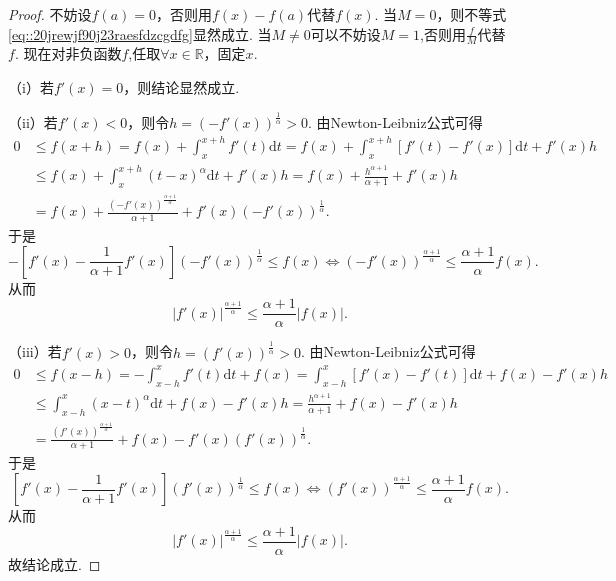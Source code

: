 \documentclass[../../main.tex]{subfiles}%
\begin{document}
\begin{proof}
不妨设$f(a)=0$，否则用$f(x) - f(a)$代替$f(x)$. 当$M = 0$，则不等式\eqref{eq::20jrewjf90j23raesfdzcgdfg}显然成立. 当$M\neq0$可以不妨设$M = 1$,否则用$\frac{f}{M}$代替$f$.
现在对非负函数$f$,任取$\forall x \in \mathbb{R}$，固定$x$.

（i）若$f'(x) = 0$，则结论显然成立.

（ii）若$f'(x) < 0$，则令$h = \left( -f'(x) \right)^{\frac{1}{\alpha}} > 0$. 由Newton-Leibniz公式可得
\begin{align*}
0 &\leqslant f(x + h) = f(x) + \int_x^{x + h} f'(t) \mathrm{d}t = f(x) + \int_x^{x + h} \left[ f'(t) - f'(x) \right] \mathrm{d}t + f'(x) h \\
&\leqslant f(x) + \int_x^{x + h} \left( t - x \right)^{\alpha} \mathrm{d}t + f'(x) h = f(x) + \frac{h^{\alpha + 1}}{\alpha + 1} + f'(x) h \\
&= f(x) + \frac{\left( -f'(x) \right)^{\frac{\alpha + 1}{\alpha}}}{\alpha + 1} + f'(x) \left( -f'(x) \right)^{\frac{1}{\alpha}}.
\end{align*}
于是
$$
-\left[ f'(x) - \frac{1}{\alpha + 1} f'(x) \right] \left( -f'(x) \right)^{\frac{1}{\alpha}} \leqslant f(x)\Longleftrightarrow \left( -f'(x) \right)^{\frac{\alpha+1}{\alpha}} \leqslant \frac{\alpha + 1}{\alpha} f(x).
$$
从而
$$
\left| f'(x) \right|^{\frac{\alpha + 1}{\alpha}} \leqslant \frac{\alpha + 1}{\alpha} |f(x)|.
$$

（iii）若$f'(x) > 0$，则令$h = \left( f'(x) \right)^{\frac{1}{\alpha}} > 0$. 由Newton-Leibniz公式可得
\begin{align*}
0 &\leqslant f(x - h) = -\int_{x - h}^x f'(t) \mathrm{d}t + f(x) = \int_{x - h}^x \left[ f'(x) - f'(t) \right] \mathrm{d}t + f(x) - f'(x) h \\
&\leqslant \int_{x - h}^x \left( x - t \right)^{\alpha} \mathrm{d}t + f(x) - f'(x) h = \frac{h^{\alpha + 1}}{\alpha + 1} + f(x) - f'(x) h \\
&= \frac{\left( f'(x) \right)^{\frac{\alpha + 1}{\alpha}}}{\alpha + 1} + f(x) - f'(x) \left( f'(x) \right)^{\frac{1}{\alpha}}.
\end{align*}
于是
$$\left[ f'(x) - \frac{1}{\alpha + 1} f'(x) \right] \left( f'(x) \right)^{\frac{1}{\alpha}} \leqslant f(x)\Longleftrightarrow \left( f'(x) \right)^{\frac{\alpha + 1}{\alpha}} \leqslant \frac{\alpha + 1}{\alpha} f(x).$$
从而
$$\left| f'(x) \right|^{\frac{\alpha + 1}{\alpha}} \leqslant \frac{\alpha + 1}{\alpha} |f(x)|.$$
故结论成立.
\end{proof}
\end{document}
